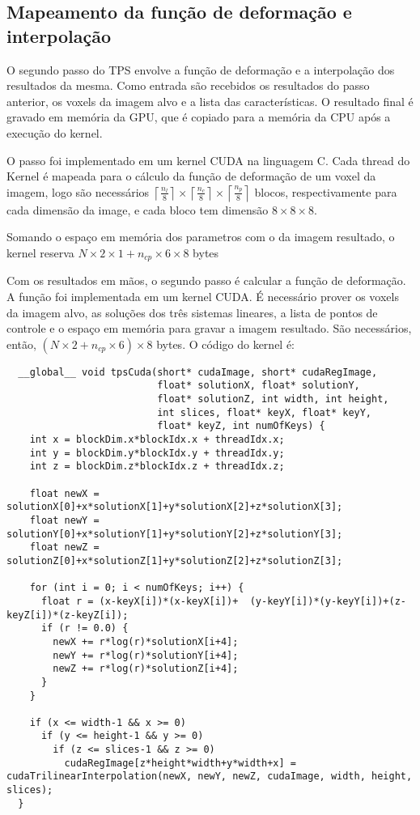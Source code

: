 \subsection{Mapeamento da função de deformação e interpolação}\label{segundoPasso}

  O segundo passo do TPS envolve a função de deformação e a interpolação dos
resultados da mesma. Como entrada são recebidos os resultados do passo anterior,
os voxels da imagem alvo e a lista das características. O resultado final é gravado
em memória da GPU, que é copiado para a memória da CPU após a execução do kernel.

  O passo foi implementado em um kernel CUDA na linguagem C. Cada thread do Kernel
é mapeada para o cálculo da função de deformação de um voxel da imagem, logo são necessários
$\left \lceil{\frac{n_l}{8}}\right \rceil \times
\left \lceil{\frac{n_c}{8}}\right \rceil \times
\left \lceil{\frac{n_p}{8}}\right \rceil$ blocos, respectivamente para
cada dimensão da image, e cada bloco tem dimensão $8 \times 8 \times 8$.

  Somando o espaço em memória dos parametros com o da imagem resultado, o kernel
reserva $N \times 2 \times 1 + n_{cp} \times 6 \times 8$ bytes

  Com os resultados em mãos, o segundo passo é calcular a função de deformação.
A função foi implementada em um kernel CUDA. É necessário prover os voxels da
imagem alvo, as soluções dos três sistemas lineares, a lista de pontos de controle
e o espaço em memória para gravar a imagem resultado. São necessários, então,
$(N \times 2 + n_{cp} \times 6) \times 8$ bytes. O código do kernel é:

\begin{lstlisting}
  __global__ void tpsCuda(short* cudaImage, short* cudaRegImage,
                          float* solutionX, float* solutionY,
                          float* solutionZ, int width, int height,
                          int slices, float* keyX, float* keyY,
                          float* keyZ, int numOfKeys) {
    int x = blockDim.x*blockIdx.x + threadIdx.x;
    int y = blockDim.y*blockIdx.y + threadIdx.y;
    int z = blockDim.z*blockIdx.z + threadIdx.z;

    float newX = solutionX[0]+x*solutionX[1]+y*solutionX[2]+z*solutionX[3];
    float newY = solutionY[0]+x*solutionY[1]+y*solutionY[2]+z*solutionY[3];
    float newZ = solutionZ[0]+x*solutionZ[1]+y*solutionZ[2]+z*solutionZ[3];

    for (int i = 0; i < numOfKeys; i++) {
      float r = (x-keyX[i])*(x-keyX[i])+  (y-keyY[i])*(y-keyY[i])+(z-keyZ[i])*(z-keyZ[i]);
      if (r != 0.0) {
        newX += r*log(r)*solutionX[i+4];
        newY += r*log(r)*solutionY[i+4];
        newZ += r*log(r)*solutionZ[i+4];
      }
    }

    if (x <= width-1 && x >= 0)
      if (y <= height-1 && y >= 0)
        if (z <= slices-1 && z >= 0)
          cudaRegImage[z*height*width+y*width+x] = cudaTrilinearInterpolation(newX, newY, newZ, cudaImage, width, height, slices);
  }
\end{lstlisting}

